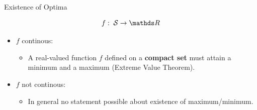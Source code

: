   
  \begin{vbframe}{Existence of Optima}
  
  $$
  f: \; \mathcal{S} \to \R
  $$
  
  \begin{itemize}
  \item $f$ continous:
  \begin{itemize}
  \item A real-valued function $f$ defined on a \textbf{compact set} must attain a minimum and a maximum (Extreme Value Theorem).
  \end{itemize}
  \item $f$ not continous:
  \begin{itemize}
  \item In general no statement possible about existence of maximum/minimum.
  \end{itemize}
  \end{itemize}
  
  
  \end{vbframe}
    
